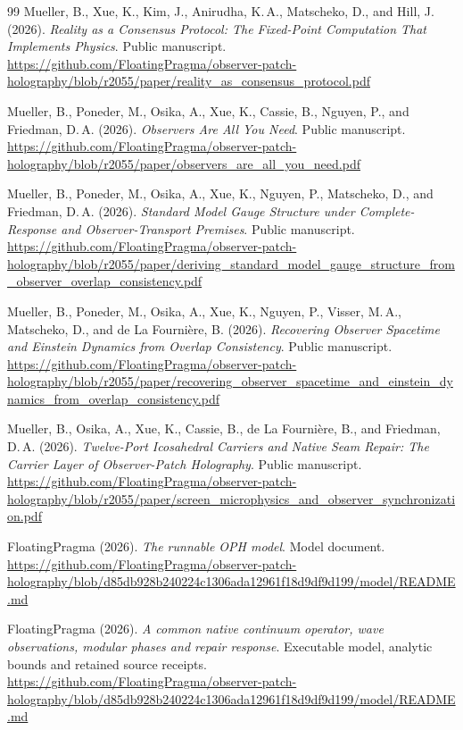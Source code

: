 \documentclass[11pt]{article}
\theoremstyle{definition}
\theoremstyle{remark}
\theoremstyle{plain}
\begin{document}
{\begin{thebibliography}{99}
Mueller, B., Xue, K., Kim, J., Anirudha, K.\,A., Matscheko, D., and Hill, J.
(2026). \emph{Reality as a Consensus Protocol: The Fixed-Point Computation That
Implements Physics}. Public manuscript.
\url{https://github.com/FloatingPragma/observer-patch-holography/blob/r2055/paper/reality_as_consensus_protocol.pdf}

Mueller, B., Poneder, M., Osika, A., Xue, K., Cassie, B., Nguyen, P., and Friedman, D.\,A.
(2026). \emph{Observers Are All You Need}. Public manuscript.
\url{https://github.com/FloatingPragma/observer-patch-holography/blob/r2055/paper/observers_are_all_you_need.pdf}

Mueller, B., Poneder, M., Osika, A., Xue, K., Nguyen, P., Matscheko, D., and Friedman, D.\,A.
(2026). \emph{Standard Model Gauge Structure under Complete-Response and Observer-Transport Premises}. Public manuscript.
\url{https://github.com/FloatingPragma/observer-patch-holography/blob/r2055/paper/deriving_standard_model_gauge_structure_from_observer_overlap_consistency.pdf}

Mueller, B., Poneder, M., Osika, A., Xue, K., Nguyen, P., Visser, M.\,A.,
Matscheko, D., and de La Fourni\`ere, B. (2026). \emph{Recovering Observer
Spacetime and Einstein Dynamics from Overlap Consistency}. Public manuscript.
\url{https://github.com/FloatingPragma/observer-patch-holography/blob/r2055/paper/recovering_observer_spacetime_and_einstein_dynamics_from_overlap_consistency.pdf}

Mueller, B., Osika, A., Xue, K., Cassie, B., de La Fourni\`ere, B., and Friedman, D.\,A. (2026).
\emph{Twelve-Port Icosahedral Carriers and Native Seam Repair: The Carrier Layer of Observer-Patch Holography}. Public manuscript.
\url{https://github.com/FloatingPragma/observer-patch-holography/blob/r2055/paper/screen_microphysics_and_observer_synchronization.pdf}

FloatingPragma (2026). \emph{The runnable OPH model}. Model document.
\url{https://github.com/FloatingPragma/observer-patch-holography/blob/d85db928b240224c1306ada12961f18d9df9d199/model/README.md}

FloatingPragma (2026). \emph{A common native continuum operator, wave
observations, modular phases and repair response}. Executable model,
analytic bounds and retained source receipts.
\url{https://github.com/FloatingPragma/observer-patch-holography/blob/d85db928b240224c1306ada12961f18d9df9d199/model/README.md}


\end{thebibliography}}
\end{document}

